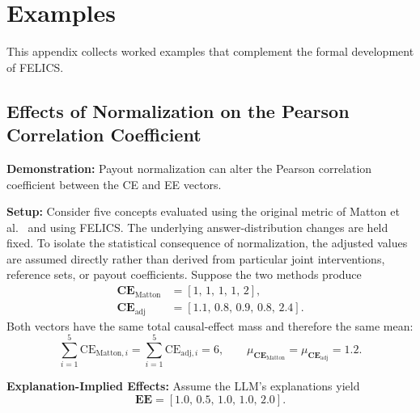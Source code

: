 \chapter{Examples}
\label{app:examples}
This appendix collects worked examples that complement the formal development of FELICS.

\section*{Effects of Normalization on the Pearson Correlation Coefficient}
\begin{example_box}[label=ex:payout_normalization_correlation_unused]
    \textbf{Demonstration:} Payout normalization can alter the Pearson correlation coefficient between the CE and EE vectors.

    \smallskip
    \textbf{Setup:} Consider five concepts evaluated using the original metric of Matton et al.~\cite{mattonWalkTalkMeasuring2024} and using FELICS. The underlying answer-distribution changes are held fixed. To isolate the statistical consequence of normalization, the adjusted values are assumed directly rather than derived from particular joint interventions, reference sets, or payout coefficients. Suppose the two methods produce
    \begin{align}
        \mathbf{CE}_{\mathrm{Matton}} & = \left[1,\,1,\,1,\,1,\,2\right], \\
        \mathbf{CE}_{\mathrm{adj}}    & = \left[1.1,\,0.8,\,0.9,\,0.8,\,2.4\right].
    \end{align}
    Both vectors have the same total causal-effect mass and therefore the same mean:
    \begin{equation}
        \sum_{i=1}^{5}\mathrm{CE}_{\mathrm{Matton},i}
        =\sum_{i=1}^{5}\mathrm{CE}_{\mathrm{adj},i}=6,
        \qquad
        \mu_{\mathbf{CE}_{\mathrm{Matton}}}
        =\mu_{\mathbf{CE}_{\mathrm{adj}}}=1.2.
    \end{equation}

    \smallskip
    \textbf{Explanation-Implied Effects:} Assume the LLM’s explanations yield
    \begin{equation}
        \mathbf{EE} = \left[1.0,\, 0.5,\, 1.0,\, 1.0,\, 2.0\right].
    \end{equation}


\end{example_box}
